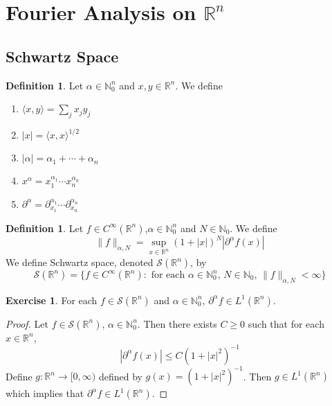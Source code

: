 \documentclass[12pt]{amsart}
\theoremstyle{definition}
\newtheorem{defn}[definition]{Definition}
\newtheorem{ex}[definition]{Exercise}
\newcommand{\p}{\partial}
\newcommand{\al}{\alpha}
\newcommand{\N}{\mathbb{N}}
\newcommand{\R}{\mathbb{R}}
\newcommand{\MS}{\mathcal{S}}
\renewcommand{\r}{\rangle}
\renewcommand{\l}{\langle}
\newcommand{\Rg}{[0,\infty)}
\newcommand{\lex}[1]{\label{ex:#1}}
\newcommand{\ld}[1]{\label{defn:#1}}
\begin{document}
	
	
	
	
	
	
	
	
	
	
	
	
	
	
	
	
	
	
	
	
	\newpage
	\section{Fourier Analysis on $\R^n$}	

	\subsection{Schwartz Space}
	\begin{defn}
	\ld{100} Let $\al \in \N_0^n$ and $x, y \in \R^n$. We define 
	\begin{enumerate}
	\item $\l x , y\r  = \sum_{j}x_jy_j$
	\item $|x| = \l x, x\r^{1/2}$
	\item $|\al| = \al_1 + \cdots + \al_n$
	\item $x^\al = x_1^{\al_1}\cdots x_n^{\al_n}$
	\item $\p^{\al} = \p_{x_1}^{\al_1} \cdots \p_{x_n}^{\al_n}$
	\end{enumerate}
	\end{defn}	
	
	\begin{defn}
	\ld{101} Let $f \in C^{\infty}(\R^n)$,$\al \in \N_0^n$ and $N \in \N_0$. We define $$\|f\|_{\al, N} = \sup_{x \in \R^n} (1 + |x|)^N |\p^{\al}f (x) |$$
	We define Schwartz space, denoted $\MS(\R^n)$, by $$\MS(\R^n) = \{f \in C^{\infty}(\R^n): \text{ for each $\al \in \N_0^n$, $N \in \N_0$, } \|f\|_{\al, N} < \infty\}$$
	\end{defn}
	
	\begin{ex}
	\lex{102} For each $f \in \MS(\R^n)$ and $\al \in \N_0^n$, $\p^\al f \in L^1(\R^n)$.
	\end{ex}
	
	\begin{proof}
	Let $f \in \MS(\R^n)$, $\al \in \N_0^n$. Then there exists $C \geq 0$ such that for each $x \in \R^n$, $$| \p^{\al} f(x)| \leq C(1+|x|^{2})^{-1}$$
	Define $g:\R^n \rightarrow \Rg$ defined by $g(x) = (1+|x|^{2})^{-1}$. Then $g \in L^1(\R^n)$ which implies that $\p^{\al} f \in L^1(\R^n)$.
	\end{proof}
	
\end{document}
